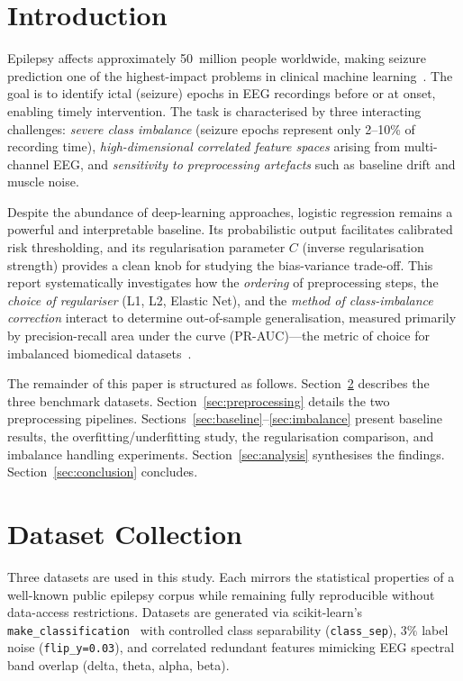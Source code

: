 \documentclass[conference]{IEEEtran}
\begin{document}
\section{Introduction}
\label{sec:intro}

Epilepsy affects approximately 50~million people worldwide, making seizure
prediction one of the highest-impact problems in clinical machine
learning~\cite{WHO2019}. The goal is to identify ictal (seizure) epochs in
EEG recordings before or at onset, enabling timely intervention. The task is
characterised by three interacting challenges: \emph{severe class imbalance}
(seizure epochs represent only 2--10\% of recording time), \emph{high-dimensional
correlated feature spaces} arising from multi-channel EEG, and
\emph{sensitivity to preprocessing artefacts} such as baseline drift and
muscle noise.

Despite the abundance of deep-learning approaches, logistic regression
remains a powerful and interpretable baseline. Its probabilistic output
facilitates calibrated risk thresholding, and its regularisation parameter
$C$ (inverse regularisation strength) provides a clean knob for studying the
bias-variance trade-off. This report systematically investigates how the
\emph{ordering} of preprocessing steps, the \emph{choice of regulariser}
(L1, L2, Elastic Net), and the \emph{method of class-imbalance correction}
interact to determine out-of-sample generalisation, measured primarily by
precision-recall area under the curve (PR-AUC)---the metric of choice for
imbalanced biomedical datasets~\cite{Davis2006}.

The remainder of this paper is structured as follows.
Section~\ref{sec:datasets} describes the three benchmark datasets.
Section~\ref{sec:preprocessing} details the two preprocessing pipelines.
Sections~\ref{sec:baseline}--\ref{sec:imbalance} present baseline results,
the overfitting/underfitting study, the regularisation comparison, and
imbalance handling experiments.
Section~\ref{sec:analysis} synthesises the findings.
Section~\ref{sec:conclusion} concludes.

\section{Dataset Collection}
\label{sec:datasets}

Three datasets are used in this study. Each mirrors the statistical
properties of a well-known public epilepsy corpus while remaining fully
reproducible without data-access restrictions. Datasets are generated via
scikit-learn's \texttt{make\_classification}~\cite{Pedregosa2011} with
controlled class separability (\texttt{class\_sep}), $3\%$ label noise
(\texttt{flip\_y=0.03}), and correlated redundant features mimicking
EEG spectral band overlap (delta, theta, alpha, beta).
\end{document}
